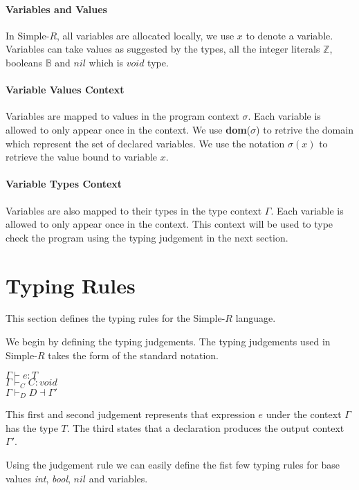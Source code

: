 \documentclass[a4paper,12pt]{report}
\begin{document}
\paragraph{Variables and Values} In Simple-$R$, all variables are allocated 
locally, we use $x$ to denote a variable. Variables can take values as suggested by the types, all the integer 
literals $\mathbb{Z}$, booleans $\mathbb{B}$ and $nil$ which is $void$ type. 

\paragraph{Variable Values Context} Variables are mapped to values in the program 
context $\sigma$. Each variable is allowed to only appear once in 
the context. We use \textbf{dom}($\sigma$) to retrive the domain which represent 
the set of declared variables. We use the notation $\sigma(x)$ 
to retrieve the value bound to variable $x$.

\paragraph{Variable Types Context} Variables are also mapped to their types 
in the type context $\Gamma$. Each variable is allowed to only appear once in 
the context. This context will be used to type check the program using the 
typing judgement in the next section.

\section{Typing Rules}
This section defines the typing rules for the Simple-$R$ language.

\par
We begin by defining the typing judgements. The typing judgements used in 
Simple-$R$ takes the form of the standard notation. 
\begin{center}
  $\Gamma \vdash e : T$\\
  $\Gamma \vdash_{C} C : void$\\
  $\Gamma \vdash_{D} D \dashv \Gamma'$\\
\end{center}
This first and second judgement represents that expression $e$ 
under the context $\Gamma$ has the type $T$. The third states that a declaration 
produces the output context $\Gamma'$.

\par
Using the judgement rule we can easily define the fist few typing rules for base 
values \textit{int}, \textit{bool}, $nil$ and variables.
\end{document}
